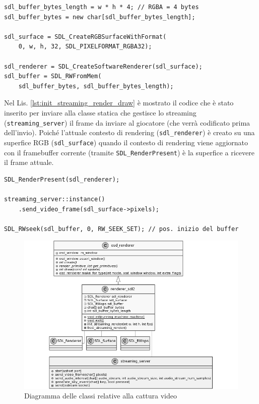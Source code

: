\begin{lstlisting}[caption=Codice aggiunto per la cattura video: inizializzazione. File: \detokenize{osd/modules/render/draw13.cpp}, label={lst:init_streaming_render_init}]
sdl_buffer_bytes_length = w * h * 4; // RGBA = 4 bytes
sdl_buffer_bytes = new char[sdl_buffer_bytes_length];

sdl_surface = SDL_CreateRGBSurfaceWithFormat(
	0, w, h, 32, SDL_PIXELFORMAT_RGBA32);

sdl_renderer = SDL_CreateSoftwareRenderer(sdl_surface);
sdl_buffer = SDL_RWFromMem(
	sdl_buffer_bytes, sdl_buffer_bytes_length);
\end{lstlisting}

Nel Lis. \ref{lst:init_streaming_render_draw} è mostrato il codice che è stato inserito per inviare alla classe statica che gestisce lo streaming (\verb|streaming_server|) il frame da inviare al giocatore (che verrà codificato prima dell'invio). Poiché l'attuale contesto di rendering (\verb|sdl_renderer|) è creato su una superfice RGB (\verb|sdl_surface|) quando il contesto di rendering viene aggiornato con il framebuffer corrente (tramite \verb|SDL_RenderPresent|) è la superfice a ricevere il frame attuale.

\begin{lstlisting}[caption=Codice aggiunto per la cattura video: disegno. File: \detokenize{osd/modules/render/draw13.cpp}, label={lst:init_streaming_render_draw}]
SDL_RenderPresent(sdl_renderer);

streaming_server::instance()
	.send_video_frame(sdl_surface->pixels);

SDL_RWseek(sdl_buffer, 0, RW_SEEK_SET); // pos. inizio del buffer
\end{lstlisting}

\begin{figure}[H]
	\includegraphics[width=\linewidth]{immagini/class_renderingSDLFull_Streaming}
	\caption{Diagramma delle classi relative alla cattura video}
	\label{fig:class_renderingSDLFull_Streaming}
\end{figure}



